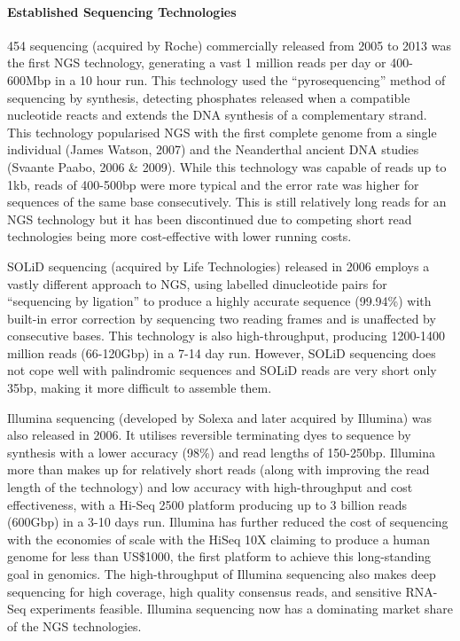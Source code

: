 \paragraph{Established Sequencing Technologies}

454 sequencing (acquired by Roche) commercially released from 2005 to 2013 was the first NGS technology, generating a vast 1 million reads per day or 400-600Mbp in a 10 hour run. This technology used the ``pyrosequencing'' method of sequencing by synthesis, detecting phosphates released when a compatible nucleotide reacts and extends the DNA synthesis of a complementary strand. This technology popularised NGS with the first complete genome from a single individual (James Watson, 2007) and the Neanderthal ancient DNA studies (Svaante Paabo, 2006 \& 2009). While this technology was capable of reads up to 1kb, reads of 400-500bp were more typical and the error rate was higher for sequences of the same base consecutively. This is still relatively long reads for an NGS technology but it has been discontinued due to competing short read technologies being more cost-effective with lower running costs.

SOLiD sequencing (acquired by Life Technologies) released in 2006 employs a vastly different approach to NGS, using labelled dinucleotide pairs for ``sequencing by ligation'' to produce a highly accurate sequence (99.94\%) with built-in error correction by sequencing two reading frames and is unaffected by consecutive bases. This technology is also high-throughput, producing 1200-1400 million reads (66-120Gbp) in a 7-14 day run. However, SOLiD sequencing does not cope well with palindromic sequences and SOLiD reads are very short only 35bp, making it more difficult to assemble them.

Illumina sequencing (developed by Solexa and later acquired by Illumina) was also released in 2006. It utilises reversible terminating dyes to sequence by synthesis with a lower accuracy (98\%) and read lengths of 150-250bp. Illumina more than makes up for relatively short reads (along with improving the read length of the technology) and low accuracy with high-throughput and cost effectiveness, with a Hi-Seq 2500 platform producing up to 3 billion reads (600Gbp) in a 3-10 days run. Illumina has further reduced the cost of sequencing with the economies of scale with the HiSeq 10X claiming to produce a human genome for less than US\$1000, the first platform to achieve this long-standing goal in genomics. The high-throughput of Illumina sequencing also makes deep sequencing for high coverage, high quality consensus reads, and sensitive RNA-Seq experiments feasible. Illumina sequencing now has a dominating market share of the NGS technologies.

